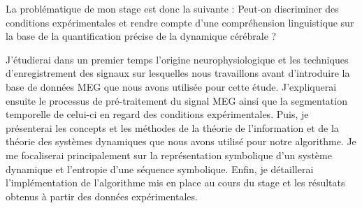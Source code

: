 La problématique de mon stage est donc la suivante : Peut-on discriminer des conditions expérimentales et rendre compte d'une compréhension linguistique sur la base de la quantification précise de la dynamique cérébrale ?

\vspace{2ex}
J'étudierai dans un premier temps l'origine neurophysiologique et les techniques d'enregistrement des signaux sur lesquelles nous travaillons avant d'introduire la base de données MEG que nous avons utilisée pour cette étude. J'expliquerai ensuite le processus de pré-traitement du signal MEG ainsi que la segmentation temporelle de celui-ci en regard des conditions expérimentales. Puis, je présenterai les concepts et les méthodes de la théorie de l'information et de la théorie des systèmes dynamiques que nous avons utilisé pour notre algorithme. Je me focaliserai principalement sur la représentation symbolique d'un système dynamique et l'entropie d'une séquence symbolique. Enfin, je détaillerai l'implémentation de l'algorithme mis en place au cours du stage et les résultats obtenus à partir des données expérimentales.

